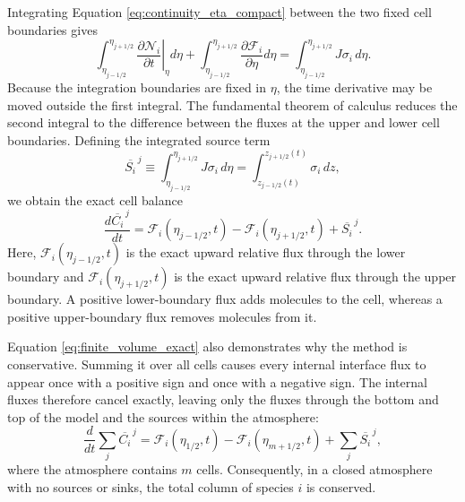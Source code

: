 \documentclass[twocolumn]{aastex631}
\begin{document}
Integrating Equation \eqref{eq:continuity_eta_compact} between the two fixed
cell boundaries gives
\begin{equation}
  \int_{\eta_{j-1/2}}^{\eta_{j+1/2}}
  \left.\frac{\partial\mathcal{N}_i}{\partial t}\right|_\eta d\eta
  +
  \int_{\eta_{j-1/2}}^{\eta_{j+1/2}}
  \frac{\partial\mathcal{F}_i}{\partial\eta}d\eta
  =
  \int_{\eta_{j-1/2}}^{\eta_{j+1/2}}J\sigma_i\,d\eta .
  \label{eq:cell_integrated_continuity}
\end{equation}
Because the integration boundaries are fixed in $\eta$, the time derivative
may be moved outside the first integral. The fundamental theorem of calculus
reduces the second integral to the difference between the fluxes at the upper
and lower cell boundaries. Defining the integrated source term
\begin{equation}
  \overline{S_i}^{\,j}
  \equiv
  \int_{\eta_{j-1/2}}^{\eta_{j+1/2}}J\sigma_i\,d\eta
  =
  \int_{z_{j-1/2}(t)}^{z_{j+1/2}(t)}\sigma_i\,dz,
  \label{eq:integrated_source}
\end{equation}
we obtain the exact cell balance
\begin{equation}
  \boxed{
  \frac{d\overline{C_i}^{\,j}}{dt}
  =
  \mathcal{F}_i(\eta_{j-1/2},t)
  -\mathcal{F}_i(\eta_{j+1/2},t)
  +\overline{S_i}^{\,j}
  }.
  \label{eq:finite_volume_exact}
\end{equation}
Here, $\mathcal{F}_i(\eta_{j-1/2},t)$ is the exact upward relative flux
through the lower boundary and $\mathcal{F}_i(\eta_{j+1/2},t)$ is the exact
upward relative flux through the upper boundary. A positive lower-boundary
flux adds molecules to the cell, whereas a positive upper-boundary flux
removes molecules from it.

Equation \eqref{eq:finite_volume_exact} also demonstrates why the method is
conservative. Summing it over all cells causes every internal interface flux
to appear once with a positive sign and once with a negative sign. The
internal fluxes therefore cancel exactly, leaving only the fluxes through the
bottom and top of the model and the sources within the atmosphere:
\begin{equation}
  \frac{d}{dt}\sum_j \overline{C_i}^{\,j}
  =
  \mathcal{F}_i(\eta_{1/2},t)
  -\mathcal{F}_i(\eta_{m+1/2},t)
  +\sum_j \overline{S_i}^{\,j},
  \label{eq:global_column_balance}
\end{equation}
where the atmosphere contains $m$ cells. Consequently, in a closed atmosphere
with no sources or sinks, the total column of species $i$ is conserved.
\end{document}
